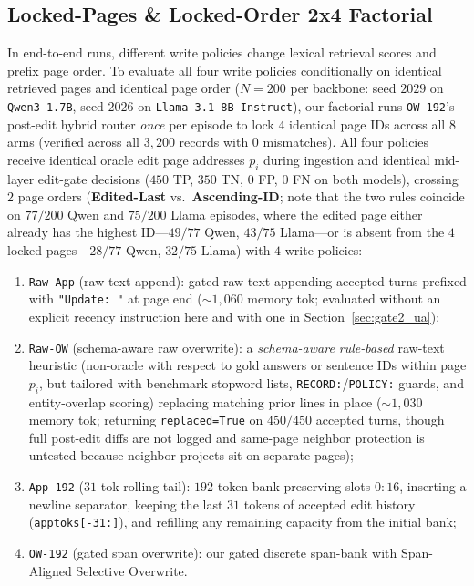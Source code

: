 \documentclass[11pt]{article}
\renewcommand{\_}{\origunderscore\allowbreak}
\begin{document}
\subsection{Locked-Pages \& Locked-Order 2x4 Factorial}
\label{sec:gate2_factorial}
In end-to-end runs, different write policies change lexical retrieval scores and prefix page order. To evaluate all four write policies conditionally on identical retrieved pages and identical page order ($N=200$ per backbone: seed $2029$ on \texttt{Qwen3-1.7B}, seed $2026$ on \texttt{Llama-3.1-8B-Instruct}), our factorial runs \texttt{OW-192}'s post-edit hybrid router \emph{once} per episode to lock $4$ identical page IDs across all $8$ arms (verified across all $3{,}200$ records with $0$ mismatches). All four policies receive identical oracle edit page addresses $p_i$ during ingestion and identical mid-layer edit-gate decisions ($450$ TP, $350$ TN, $0$ FP, $0$ FN on both models), crossing $2$ page orders (\textbf{Edited-Last} vs.\ \textbf{Ascending-ID}; note that the two rules coincide on $77/200$ Qwen and $75/200$ Llama episodes, where the edited page either already has the highest ID---$49/77$ Qwen, $43/75$ Llama---or is absent from the $4$ locked pages---$28/77$ Qwen, $32/75$ Llama) with $4$ write policies:
\begin{enumerate}
    \item \texttt{Raw-App} (raw-text append): gated raw text appending accepted turns prefixed with \texttt{"Update: "} at page end ($\sim 1{,}060$ memory tok; evaluated without an explicit recency instruction here and with one in Section~\ref{sec:gate2_ua});
    \item \texttt{Raw-OW} (schema-aware raw overwrite): a \emph{schema-aware rule-based} raw-text heuristic (non-oracle with respect to gold answers or sentence IDs within page $p_i$, but tailored with benchmark stopword lists, \texttt{RECORD:}/\texttt{POLICY:} guards, and entity-overlap scoring) replacing matching prior lines in place ($\sim 1{,}030$ memory tok; returning \texttt{replaced=True} on $450/450$ accepted turns, though full post-edit diffs are not logged and same-page neighbor protection is untested because neighbor projects sit on separate pages);
    \item \texttt{App-192} ($31$-tok rolling tail): $192$-token bank preserving slots $0{:}16$, inserting a newline separator, keeping the last $31$ tokens of accepted edit history (\texttt{app\_toks[-31:]}), and refilling any remaining capacity from the initial bank;
    \item \texttt{OW-192} (gated span overwrite): our gated discrete span-bank with Span-Aligned Selective Overwrite.
\end{enumerate}
\end{document}
